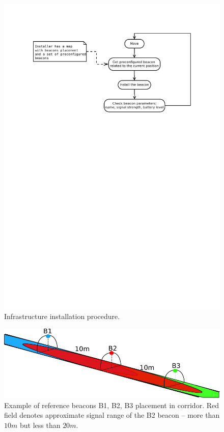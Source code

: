 \documentclass[../main.tex]{subfiles}
\begin{document}
\begin{figure}[!htbp]
\includegraphics[width=\textwidth, trim={0 18cm 0 0},clip]{pictures/infrastructure_installation_proc.pdf}
\centering
\caption{Infrastructure installation procedure.}
\label{fig:infrastructure_installation_proc}
\end{figure}

\begin{figure}[!htbp]
\includegraphics[width=\textwidth,clip]{pictures/beacons_placement.pdf}
\centering
\caption{Example of reference beacons B1, B2, B3 placement in corridor. Red field denotes approximate signal range of the B2 beacon -- more than $10m$ but less than $20m$.}
\label{fig:beacons_placement}
\end{figure}
\end{document}
